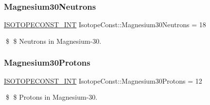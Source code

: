 \subsubsection{\texorpdfstring{Magnesium30\+Neutrons}{Magnesium30Neutrons}}
{\footnotesize\ttfamily \mbox{\hyperlink{group___isotope_const-_macros_ga5f18360b3e99483a35c32d789e62621c}{I\+S\+O\+T\+O\+P\+E\+C\+O\+N\+S\+T\+\_\+\+I\+NT}} Isotope\+Const\+::\+Magnesium30\+Neutrons = 18}

\$ \$ Neutrons in Magnesium-\/30. \mbox{\label{group___isotope_const-_magnesium-_mg30_gaff3e4c6004c3a483938e3a0d3ea1d7ce}} 
\subsubsection{\texorpdfstring{Magnesium30\+Protons}{Magnesium30Protons}}
{\footnotesize\ttfamily \mbox{\hyperlink{group___isotope_const-_macros_ga5f18360b3e99483a35c32d789e62621c}{I\+S\+O\+T\+O\+P\+E\+C\+O\+N\+S\+T\+\_\+\+I\+NT}} Isotope\+Const\+::\+Magnesium30\+Protons = 12}

\$ \$ Protons in Magnesium-\/30. 